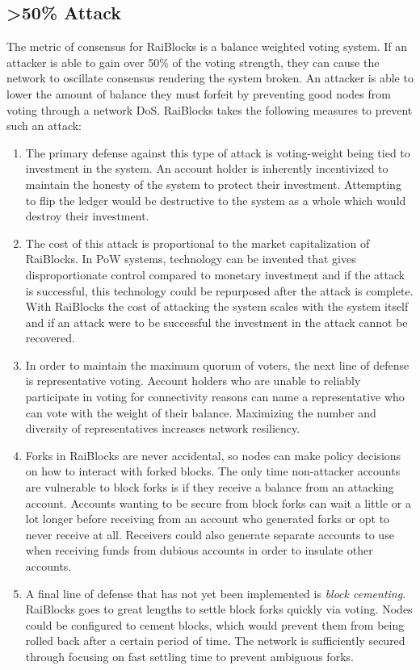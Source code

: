 \subsection{\textgreater 50\% Attack} \label{sec:attack_50}
The metric of consensus for RaiBlocks is a balance weighted voting system. If an attacker is able to gain over 50\% of the voting strength, they can cause the network to oscillate consensus rendering the system broken. An attacker is able to lower the amount of balance they must forfeit by preventing good nodes from voting through a network DoS. RaiBlocks takes the following measures to prevent such an attack:
\begin{enumerate}
  \item The primary defense against this type of attack is voting-weight being tied to investment in the system. An account holder is inherently incentivized to maintain the honesty of the system to protect their investment. Attempting to flip the ledger would be destructive to the system as a whole which would destroy their investment.
  
  \item The cost of this attack is proportional to the market capitalization of RaiBlocks. In PoW systems, technology can be invented that gives disproportionate control compared to monetary investment and if the attack is successful, this technology could be repurposed after the attack is complete. With RaiBlocks the cost of attacking the system scales with the system itself and if an attack were to be successful the investment in the attack cannot be recovered.

  
  \item In order to maintain the maximum quorum of voters, the next line of defense is representative voting. Account holders who are unable to reliably participate in voting for connectivity reasons can name a representative who can vote with the weight of their balance. Maximizing the number and diversity of representatives increases network resiliency.
  
  \item Forks in RaiBlocks are never accidental, so nodes can make policy decisions on how to interact with forked blocks. The only time non-attacker accounts are vulnerable to block forks is if they receive a balance from an attacking account. Accounts wanting to be secure from block forks can wait a little or a lot longer before receiving from an account who generated forks or opt to never receive at all. Receivers could also generate separate accounts to use when receiving funds from dubious accounts in order to insulate other accounts.
  
  \item A final line of defense that has not yet been implemented is \textit{block cementing}. RaiBlocks goes to great lengths to settle block forks quickly via voting. Nodes could be configured to cement blocks, which would prevent them from being rolled back after a certain period of time. The network is sufficiently secured through focusing on fast settling time to prevent ambiguous forks.
\end{enumerate}

